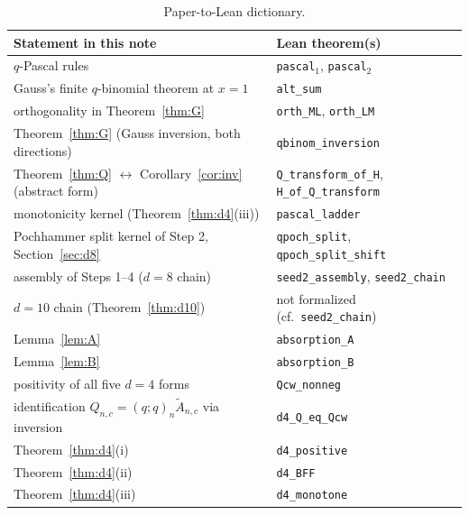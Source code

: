\documentclass[11pt]{article}
\newcommand{\poch}[1]{(q;q)_{#1}}
\begin{document}
\begin{table}[ht]
\centering
\small
\begin{tabular}{ll}
\toprule
Statement in this note & Lean theorem(s) \\
\midrule
$q$-Pascal rules & \texttt{pascal}$_1$, \texttt{pascal}$_2$ \\
Gauss's finite $q$-binomial theorem at $x=1$ & \texttt{alt\_sum} \\
orthogonality in Theorem~\ref{thm:G} & \texttt{orth\_ML},
\texttt{orth\_LM} \\
Theorem~\ref{thm:G} (Gauss inversion, both directions) &
\texttt{qbinom\_inversion} \\
Theorem~\ref{thm:Q} $\leftrightarrow$ Corollary~\ref{cor:inv}
(abstract form) & \texttt{Q\_transform\_of\_H},
\texttt{H\_of\_Q\_transform} \\
monotonicity kernel (Theorem~\ref{thm:d4}(iii)) &
\texttt{pascal\_ladder} \\
Pochhammer split kernel of Step 2, Section~\ref{sec:d8} &
\texttt{qpoch\_split}, \texttt{qpoch\_split\_shift} \\
assembly of Steps 1--4 ($d=8$ chain) &
\texttt{seed2\_assembly}, \texttt{seed2\_chain} \\
$d=10$ chain (Theorem~\ref{thm:d10}) & not formalized
(cf.\ \texttt{seed2\_chain}) \\
Lemma~\ref{lem:A} & \texttt{absorption\_A} \\
Lemma~\ref{lem:B} & \texttt{absorption\_B} \\
positivity of all five $d=4$ forms & \texttt{Qcw\_nonneg} \\
identification $Q_{n,c}=\poch{n}\widetilde A_{n,c}$ via inversion &
\texttt{d4\_Q\_eq\_Qcw} \\
Theorem~\ref{thm:d4}(i) & \texttt{d4\_positive} \\
Theorem~\ref{thm:d4}(ii) & \texttt{d4\_BFF} \\
Theorem~\ref{thm:d4}(iii) & \texttt{d4\_monotone} \\
\bottomrule
\end{tabular}
\caption{Paper-to-Lean dictionary.}
\label{tab:lean}
\end{table}
\end{document}
